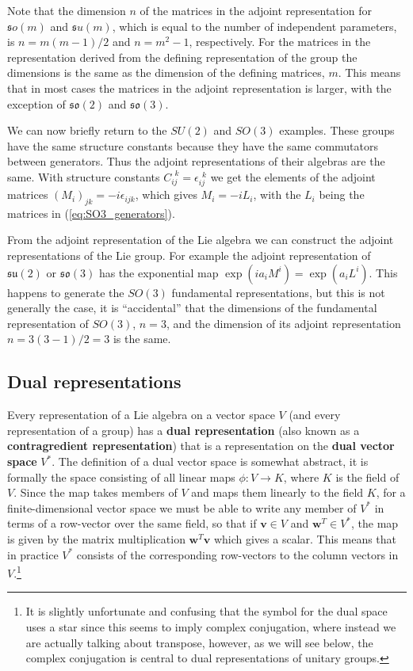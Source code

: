 \documentclass[notes.tex]{subfiles}
\begin{document}
Note that the dimension $n$ of the matrices in the adjoint representation for $\mathfrak so(m)$ and $\mathfrak su(m)$, which is equal to the number of independent parameters, is $n=m(m-1)/2$ and $n=m^2-1$, respectively. For the matrices in the representation derived from the defining representation of the group the dimensions is the same as the dimension of the defining matrices, $m$. This means that in most cases the matrices in the adjoint representation is larger, with the exception of  $\mathfrak{so}(2)$ and  $\mathfrak{so}(3)$.

We can now briefly return to the $SU(2)$ and $SO(3)$ examples. These groups have the same structure constants because they have the same commutators between generators. Thus the adjoint representations of their algebras are the same. With structure constants $C^{~~k}_{ij}=\epsilon_{ij}^{~~k}$ we get the elements of the adjoint matrices $(M_i)_{jk} =-i\epsilon_{ijk}$, which gives $M_i=-iL_i$, with the $L_i$ being the matrices in (\ref{eq:SO3_generators}). 

From the adjoint representation of the Lie algebra we can construct  the adjoint representations of the Lie group. For example the adjoint representation of  $\mathfrak{su}(2)$ or $\mathfrak{so}(3)$ has the exponential map $\exp{(ia_i M^i)}=\exp{(a_i L^i)}$. This happens to generate the $SO(3)$ fundamental representations, but this is not generally the case, it is ``accidental'' that the dimensions of the fundamental representation of $SO(3)$, $n=3$, and the dimension of its adjoint representation $n=3(3-1)/2=3$ is the same.


\subsection{Dual representations}
\label{sec:dual_reps}

Every representation of a Lie algebra on a vector space $V$ (and every representation of a group) has a {\bf dual representation} (also known as a {\bf contragredient representation}) that is a representation on the {\bf dual vector space} $V^*$. The definition of a dual vector space is somewhat abstract, it is formally the space consisting of all linear maps $\phi:V\to K$, where $K$ is the field of $V$. Since the map takes members of $V$ and maps them linearly to the field $K$, for a finite-dimensional vector space we must be able to write any member of $V^*$ in terms of a row-vector over the same field, so that if $\mathbf v\in V$ and $\mathbf w^T \in V^*$, the map is given by the matrix multiplication $\mathbf w^T \mathbf v$ which gives a scalar. This means that in practice  $V^*$ consists of the corresponding row-vectors to the column vectors in $V$.\footnote{It is slightly unfortunate and confusing that the symbol for the dual space uses a star since this seems to imply complex conjugation, where instead we are actually talking about transpose, however, as we will see below, the complex conjugation is central to dual representations of unitary groups.}
\end{document}
